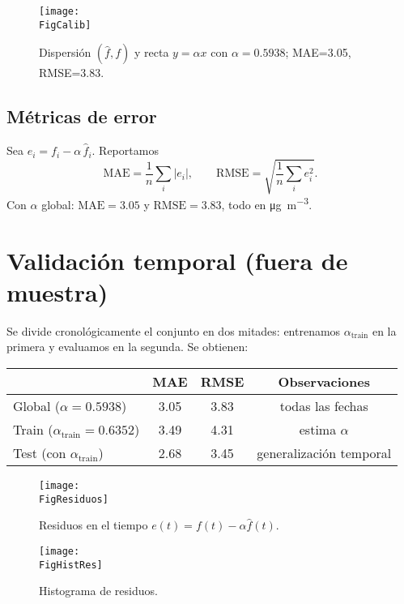 \documentclass[11pt,a4paper]{article}
\newcommand{\AlphaGlobal}{0.5938}
\newcommand{\MAEglobal}{3.05}
\newcommand{\RMSEglobal}{3.83}
\newcommand{\AlphaTrain}{0.6352}
\newcommand{\MAEtrain}{3.49}
\newcommand{\RMSEtrain}{4.31}
\newcommand{\MAEtest}{2.68}
\newcommand{\RMSEtest}{3.45}
\newcommand{\FigCalib}{calibracion_win180.png}
\newcommand{\FigResiduos}{residuos_tiempo.png}
\newcommand{\FigHistRes}{hist_residuos.png}
\begin{document}
\begin{figure}[h]
\centering
\texttt{[image: \\FigCalib]}
\caption{Dispersión $(\hat f, f)$ y recta $y=\alpha x$ con $\alpha=\num{\AlphaGlobal}$; MAE=\num{\MAEglobal}, RMSE=\num{\RMSEglobal}.}
\label{fig:calib}
\end{figure}

\subsection{Métricas de error}
Sea $e_i=f_i-\alpha\,\hat f_i$. Reportamos
\begin{equation}
\mathrm{MAE}=\frac{1}{n}\sum_i |e_i|,\qquad
\mathrm{RMSE}=\sqrt{\frac{1}{n}\sum_i e_i^2}.
\end{equation}
Con $\alpha$ global: $\mathrm{MAE}=\num{\MAEglobal}$ y $\mathrm{RMSE}=\num{\RMSEglobal}$, todo en \si{\micro\gram\per\meter\cubed}.

\section{Validación temporal (fuera de muestra)}
Se divide cronológicamente el conjunto en dos mitades: entrenamos $\alpha_{\text{train}}$ en la primera y evaluamos en la segunda. Se obtienen:
\begin{center}
\begin{tabular}{lccc}
\toprule
 & MAE & RMSE & Observaciones \\
\midrule
Global ($\alpha=\num{\AlphaGlobal}$) & \num{\MAEglobal} & \num{\RMSEglobal} & todas las fechas \\
Train ($\alpha_{\text{train}}=\num{\AlphaTrain}$) & \num{\MAEtrain} & \num{\RMSEtrain} & estima $\alpha$ \\
Test (con $\alpha_{\text{train}}$) & \num{\MAEtest} & \num{\RMSEtest} & generalización temporal \\
\bottomrule
\end{tabular}
\end{center}

\begin{figure}[h]
\centering
\texttt{[image: \\FigResiduos]}
\caption{Residuos en el tiempo $e(t)=f(t)-\alpha \hat f(t)$.}
\label{fig:residuos}
\end{figure}

\begin{figure}[h]
\centering
\texttt{[image: \\FigHistRes]}
\caption{Histograma de residuos.}
\label{fig:histres}
\end{figure}
\end{document}
